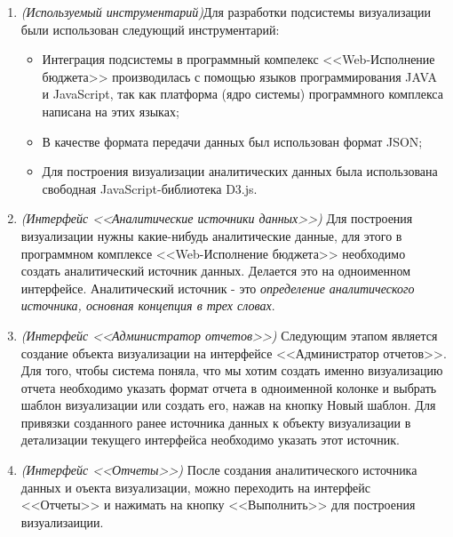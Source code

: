 \documentclass[a4paper]{report}
\begin{document}
\begin{enumerate}[label=\textbf{\arabic*})]
    \item \textit{(Используемый инструментарий)}Для разработки подсистемы визуализации были использован следующий инструментарий:
        \begin{itemize}
            \item Интеграция подсистемы в программный компелекс <<Web-Исполнение бюджета>> производилась с помощью языков программирования JAVA и JavaScript, так как платформа (ядро системы) программного комплекса написана на этих языках;
            \item В качестве формата передачи данных был использован формат JSON;
            \item Для построения визуализации аналитических данных была использована свободная JavaScript-библиотека D3.js.
        \end{itemize}
    \item \textit{(Интерфейс <<Аналитические источники данных>>)} Для построения визуализации нужны какие-нибудь аналитические данные, для этого в программном комплексе <<Web-Исполнение бюджета>> необходимо создать аналитический источник данных. Делается это на одноименном интерфейсе. Аналитический источник - это \textit{определение аналитического источника, основная концепция в трех словах}.
    \item \textit{(Интерфейс <<Администратор отчетов>>)} Следующим этапом является создание объекта визуализации на интерфейсе <<Администратор отчетов>>. Для того, чтобы система поняла, что мы хотим создать именно визуализацию отчета необходимо указать формат отчета в одноименной колонке и выбрать шаблон визуализации или создать его, нажав на кнопку Новый шаблон. Для привязки созданного ранее источника данных к объекту визуализации в детализации текущего интерфейса необходимо указать этот источник.
    \item \textit{(Интерфейс <<Отчеты>>)} После создания аналитического источника данных и оъекта визуализации, можно переходить на интерфейс <<Отчеты>> и нажимать на кнопку <<Выполнить>> для построения визуализаиции.
\end{enumerate}
\end{document}
